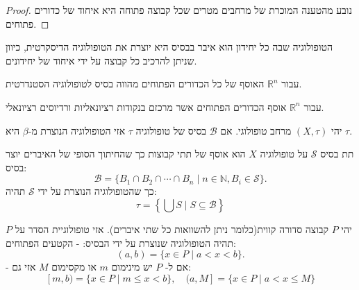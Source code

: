 \documentclass{tstextbook}
\begin{document}
\begin{proof}
נובע מהטענה המוכרת של מרחבים מטרים שכל קבוצה פתוחה היא איחוד של כדורים פתוחים.

\end{proof}
\begin{example}
הטופולוגיה שבה כל יחידון הוא איבר בבסיס היא יוצרת את הטופולוגיה הדיסקרטית, כיוון שניתן להרכיב כל קבוצה על ידי איחוד של יחידונים.

\end{example}
\begin{example}
עבור \(\mathbb{R}^{n}\) האוסף של כל הכדורים הפתוחים מהווה בסיס לטופולוגיה הסטנדרטית.

\end{example}
\begin{example}
עבור \(\mathbb{R}^{n}\) אוסף הכדורים הפתוחים אשר מרכזם בנקודות רציונאליות ורדיוסים רציונאלי.

\end{example}
\begin{proposition}
יהי \(\left( X,\tau \right)\) מרחב טופולוגי. אם \(\mathcal{B}\) בסיס של טופולוגיה \(\tau\) אזי הטופולוגיה הנוצרת מ-\(\beta\) היא \(\tau\).

\end{proposition}
\begin{definition}[תת בסיס]
תת בסיס \(\mathcal{S}\) על טופולוגיה \(X\) הוא אוסף של תתי קבוצות כך שהחיתוך הסופי של האיברים יוצר בסיס:
$${\mathcal{B}}=\{B_{1}\cap B_{2}\cap\cdots\cap B_{n}\mid n\in\mathbb{N},B_{i}\in{\mathcal{S}}\}.$$
כך שהטופולוגיה הנוצרת על ידי \(\mathcal{S}\) תהיה:
$$\tau=\left\{\bigcup S\mid S\subseteq\mathcal{B}\right\}$$

\end{definition}
\begin{definition}
יהי \(P\) קבוצה סדורה קווית(כלומר ניתן להשוואות כל שתי איברים). אזי טופולוגיית הסדר על \(P\) תהיה הטופולוגיה שנוצרת על ידי הבסיס:
- הקטעים הפתוחים:
$$(a,b)=\{x\in P\mid a<x<b\}.$$
- אם ל- \(P\) יש מינימום \(m\) או מקסימום \(M\) אזי גם:
$$[m,b)=\{x\in P\mid m\leq x<b\},\quad(a,M]=\{x\in P\mid a<x\leq M\}$$

\end{definition}
\end{document}
